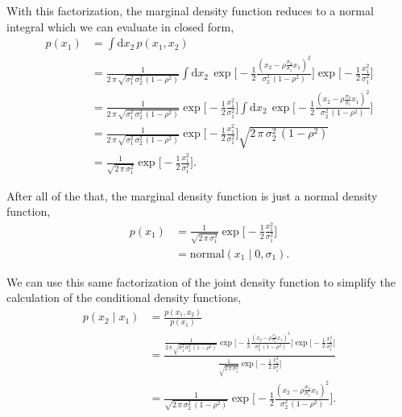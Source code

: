\documentclass[
  letterpaper,
  DIV=11,
  numbers=noendperiod]{scrartcl}
\begin{document}
With this factorization, the marginal density function reduces to a
normal integral which we can evaluate in closed form, \begin{align*}
p ( x_{1} )
&=
\int \mathrm{d} x_{2} \,
p( x_{1}, x_{2} )
\\
&=
\frac{1}{
  2 \, \pi \,
  \sqrt{ \sigma_{1}^{2} \, \sigma_{2}^{2} \, (1 - \rho^{2} ) }
}
\int \mathrm{d} x_{2} \,
\exp \Bigg[
  -\frac{1}{2}
    \frac{
      \left(
        x_{2} - \rho \frac{ \sigma_{2} }{ \sigma_{1} } x_{1}
      \right)^{2}
    }{
      \sigma_{2}^{2} \, (1 - \rho^{2} )
    }
\Bigg]
\exp \Bigg[
  -\frac{1}{2} \frac{  x_{1}^{2} }{ \sigma_{1}^{2} }
\Bigg]
\\
&=
\frac{1}{
  2 \, \pi \,
  \sqrt{ \sigma_{1}^{2} \, \sigma_{2}^{2} \, (1 - \rho^{2} ) }
}
\exp \Bigg[
  -\frac{1}{2} \frac{  x_{1}^{2} }{ \sigma_{1}^{2} }
\Bigg]
\int \mathrm{d} x_{2} \,
\exp \Bigg[
  -\frac{1}{2}
    \frac{
      \left(
        x_{2} - \rho \frac{ \sigma_{2} }{ \sigma_{1} } x_{1}
      \right)^{2}
    }{
      \sigma_{2}^{2} \, (1 - \rho^{2} )
    }
\Bigg]
\\
&=
\frac{1}{
  2 \, \pi \,
  \sqrt{ \sigma_{1}^{2} \, \sigma_{2}^{2} \, (1 - \rho^{2} ) }
}
\exp \Bigg[
  -\frac{1}{2} \frac{  x_{1}^{2} }{ \sigma_{1}^{2} }
\Bigg]
\sqrt{ 2 \, \pi \, \sigma_{2}^{2} \, (1 - \rho^{2} ) }
\\
&=
\frac{1}{ \sqrt{2 \, \pi \, \sigma_{1}^{2} } }
\exp \Bigg[
  -\frac{1}{2} \frac{  x_{1}^{2} }{ \sigma_{1}^{2} }
\Bigg].
\end{align*}

After all of the that, the marginal density function is just a normal
density function, \begin{align*}
p ( x_{1} )
&=
\frac{1}{ \sqrt{2 \, \pi \, \sigma_{1}^{2} } }
\exp \Bigg[
  -\frac{1}{2} \frac{  x_{1}^{2} }{ \sigma_{1}^{2} }
\Bigg]
\\
&=
\text{normal} ( x_{1} \mid 0, \sigma_{1} ).
\end{align*}

We can use this same factorization of the joint density function to
simplify the calculation of the conditional density functions,
\begin{align*}
p ( x_{2} \mid x_{1} )
&=
\frac{ p ( x_{1},  x_{2} ) }{ p ( x_{1} ) }
\\
&=
\frac{
  \frac{1}{
    2 \, \pi \,
    \sqrt{ \sigma_{1}^{2} \, \sigma_{2}^{2} \, (1 - \rho^{2} ) }
  }
  \exp \Bigg[
    -\frac{1}{2}
        \frac{
        \left(
          x_{2} - \rho \frac{ \sigma_{2} }{ \sigma_{1} } x_{1}
        \right)^{2}
      }{
        \sigma_{2}^{2} \, (1 - \rho^{2} )
      }
  \Bigg]
  \exp \Bigg[
    -\frac{1}{2} \frac{  x_{1}^{2} }{ \sigma_{1}^{2} }
  \Bigg]
}{
  \frac{1}{ \sqrt{2 \, \pi \, \sigma_{1}^{2} } }
  \exp \Bigg[
    -\frac{1}{2} \frac{  x_{1}^{2} }{ \sigma_{1}^{2} }
  \Bigg]
}
\\
&=
\frac{1}{
  \sqrt{ 2 \, \pi \, \sigma_{2}^{2} \, (1 - \rho^{2} ) }
}
\exp \Bigg[
  -\frac{1}{2}
      \frac{
      \left(
        x_{2} - \rho \frac{ \sigma_{2} }{ \sigma_{1} } x_{1}
      \right)^{2}
    }{
      \sigma_{2}^{2} \, (1 - \rho^{2} )
    }
\Bigg].
\end{align*}
\end{document}
